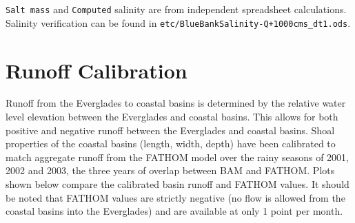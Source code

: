 \texttt{Salt mass} and \texttt{Computed} salinity are from independent spreadsheet calculations.  Salinity verification can be found in \texttt{etc/BlueBankSalinity-Q+1000cms\_dt1.ods}.

\clearpage 
\section{Runoff Calibration}
\label{sec:Runoff Calibration}
Runoff from the Everglades to coastal basins is determined by the relative water level elevation between the Everglades and coastal basins.  This allows for both positive and negative runoff between the Everglades and coastal basins.  Shoal properties of the coastal basins (length, width, depth) have been calibrated to match aggregate runoff from the FATHOM model \citep{Cosby2010} over the rainy seasons of 2001, 2002 and 2003, the three years of overlap between BAM and FATHOM.  Plots shown below compare the calibrated basin runoff and FATHOM values. It should be noted that FATHOM values are strictly negative (no flow is allowed from the coastal basins into the Everglades) and are available at only 1 point per month. \\[-1cm]

